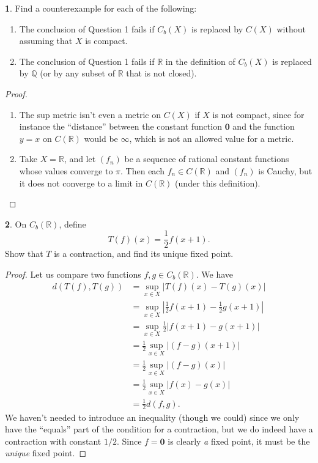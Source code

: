 \documentclass[12pt]{article}
\theoremstyle{definition}
\newtheorem{ex}{}
\begin{document}
\begin{ex}
	Find a counterexample for each of the following: \begin{enumerate}[label=(\alph*)]
		\item The conclusion of Question 1 fails if $C_b(X)$ is replaced by $C(X)$ without assuming that $X$ is compact.
		\item The conclusion of Question 1 fails if $\mathbb{R}$ in the definition of $C_b(X)$ is replaced by $\mathbb{Q}$ (or by any subset of $\mathbb{R}$ that is not closed).
	\end{enumerate}
\end{ex}
\begin{proof}
	\begin{enumerate}[label=(\alph*)]
		\item The sup metric isn't even a metric on $C(X)$ if $X$ is not compact, since for instance the ``distance'' between the constant function $\mathbf{0}$ and the function $y = x$ on $C(\mathbb{R})$ would be $\infty$, which is not an allowed value for a metric.
		\item Take $X = \mathbb{R}$, and let $(f_n)$ be a sequence of rational constant functions whose values converge to $\pi$.
		      Then each $f_n \in C(\mathbb{R})$ and $(f_n)$ is Cauchy, but it does not converge to a limit in $C(\mathbb{R})$ (under this definition).
	\end{enumerate}
\end{proof}

\begin{ex}
	On $C_b(\mathbb{R})$, define \begin{equation*}
		T(f)(x) = \frac{1}{2}f(x+1).
	\end{equation*}
	Show that $T$ is a contraction, and find its unique fixed point.
\end{ex}
\begin{proof}
	Let us compare two functions $f, g \in C_b(\mathbb{R})$.
	We have \begin{align*}
		d(T(f), T(g)) & = \sup_{x \in X} |T(f)(x) - T(g)(x)|                                      \\
		              & = \sup_{x \in X} \left| \frac{1}{2}f(x + 1) - \frac{1}{2}g(x + 1) \right| \\
		              & = \sup_{x \in X} \frac{1}{2}\left| f(x + 1) - g(x + 1) \right|            \\
		              & = \frac{1}{2}\sup_{x \in X} \left| (f - g)(x + 1) \right|                 \\
		              & = \frac{1}{2}\sup_{x \in X} \left| (f - g)(x) \right|                     \\
		              & = \frac{1}{2}\sup_{x \in X} \left| f(x) - g(x) \right|                    \\
		              & = \frac{1}{2}d(f, g).
	\end{align*}
	We haven't needed to introduce an inequality (though we could) since we only have the ``equals'' part of the condition for a contraction, but we do indeed have a contraction with constant $1/2$.
	Since $f = \mathbf{0}$ is clearly \textit{a} fixed point, it must be the \textit{unique} fixed point.
\end{proof}
\end{document}
